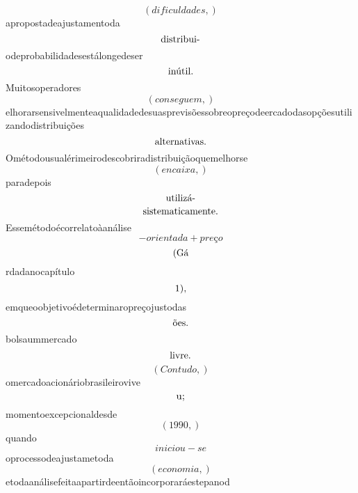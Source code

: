 \documentclass{article}
\begin{document}
\begin{equation}
\left( dificuldades,\right)
\end{equation}apropostadeajustamentoda\begin{equation}
$distribui-$
\end{equation}odeprobabilidadesestálongedeser\begin{equation}
$inútil.$
\end{equation}Muitosoperadores\begin{equation}
\left( conseguem,\right)
\end{equation}elhorarsensivelmenteaqualidadedesuasprevisõessobreopreçodeercadodasopçõesutilizandodistribuições\begin{equation}
$alternativas.$
\end{equation}Ométodousualérimeirodescobriradistribuiçãoquemelhorse\begin{equation}
\left( encaixa,\right)
\end{equation}paradepois\begin{equation}
$utilizá-$
\end{equation}\begin{equation}
$sistematicamente.$
\end{equation}Essemétodoécorrelatoàanálise\begin{equation}
- orientada + preço
\end{equation}\begin{equation}
$(Gá$
\end{equation}rdadanocapítulo\begin{equation}
$1),$
\end{equation}emqueoobjetivoédeterminaropreçojustodas\begin{equation}
$ões.$
\end{equation}bolsaummercado\begin{equation}
$livre.$
\end{equation}\begin{equation}
\left( Contudo,\right)
\end{equation}omercadoacionáriobrasileirovive\begin{equation}
$u;$
\end{equation}momentoexcepcionaldesde\begin{equation}
\left( 1990,\right)
\end{equation}quando\begin{equation}
iniciou - se
\end{equation}oprocessodeajustametoda\begin{equation}
\left( economia,\right)
\end{equation}etodaanálisefeitaapartirdeentãoincorporaráestepanod\begin{equation}

\end{equation}
\end{document}
